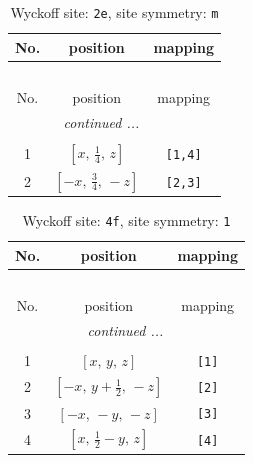 \documentclass[fleqn,8pt]{jsarticle}
\begin{document}
\begin{longtable}{ccc}
\caption{Wyckoff site: {\tt 2e}, site symmetry: {\tt m}}
 \\
 \hline \hline
No. & position & mapping \\ \hline \endfirsthead

\multicolumn{2}{l}{\tablename\ \thetable{}} \\
 \hline \hline
No. & position & mapping \\ \hline \endhead

 \hline \hline
\multicolumn{2}{r}{\footnotesize\it continued ...} \\ \endfoot

 \hline \hline
\multicolumn{2}{r}{} \\ \endlastfoot

1 & $\left[ x,\, \frac{1}{4},\, z \right]$ & {\tt [1,4]} \\ \hline
2 & $\left[ - x,\, \frac{3}{4},\, - z \right]$ & {\tt [2,3]} \\
\end{longtable}
\renewcommand{\arraystretch}{1.2}
\begin{longtable}{ccc}
\caption{Wyckoff site: {\tt 4f}, site symmetry: {\tt 1}}
 \\
 \hline \hline
No. & position & mapping \\ \hline \endfirsthead

\multicolumn{2}{l}{\tablename\ \thetable{}} \\
 \hline \hline
No. & position & mapping \\ \hline \endhead

 \hline \hline
\multicolumn{2}{r}{\footnotesize\it continued ...} \\ \endfoot

 \hline \hline
\multicolumn{2}{r}{} \\ \endlastfoot

1 & $\left[ x,\, y,\, z \right]$ & {\tt [1]} \\ \hline
2 & $\left[ - x,\, y + \frac{1}{2},\, - z \right]$ & {\tt [2]} \\ \hline
3 & $\left[ - x,\, - y,\, - z \right]$ & {\tt [3]} \\ \hline
4 & $\left[ x,\, \frac{1}{2} - y,\, z \right]$ & {\tt [4]} \\
\end{longtable}
\end{document}
